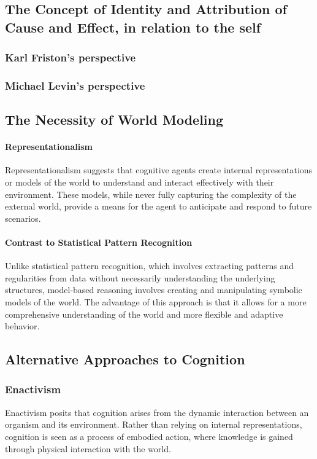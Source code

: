\documentclass[twocolumn]{article}
\begin{document}
\subsection{The Concept of Identity and Attribution of Cause and Effect, in relation to the self}
\subsubsection{Karl Friston's perspective}
\subsubsection{Michael Levin's perspective}
\subsection{The Necessity of World Modeling}
\paragraph{Representationalism}
Representationalism suggests that cognitive agents create internal representations or models of the world to understand and interact effectively with their environment. These models, while never fully capturing the complexity of the external world, provide a means for the agent to anticipate and respond to future scenarios.
\paragraph{Contrast to Statistical Pattern Recognition}
Unlike statistical pattern recognition, which involves extracting patterns and regularities from data without necessarily understanding the underlying structures, model-based reasoning involves creating and manipulating symbolic models of the world. The advantage of this approach is that it allows for a more comprehensive understanding of the world and more flexible and adaptive behavior.
\subsection{Alternative Approaches to Cognition}
\subsubsection{Enactivism}
Enactivism posits that cognition arises from the dynamic interaction between an organism and its environment. Rather than relying on internal representations, cognition is seen as a process of embodied action, where knowledge is gained through physical interaction with the world.
\end{document}
